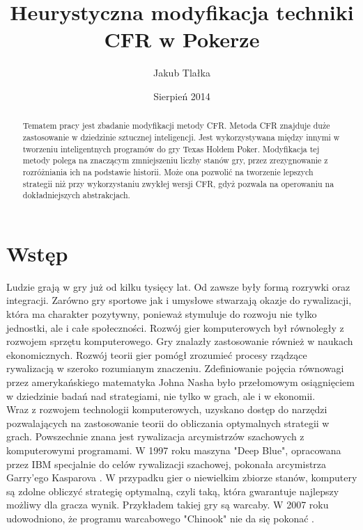 \documentclass[magisterska]{pracamgr}
\author{Jakub Tlałka}
\title{Heurystyczna modyfikacja techniki CFR w Pokerze}
\date{Sierpień 2014}
\begin{document}
\maketitle

\begin{abstract}
Tematem pracy jest zbadanie modyfikacji metody CFR. Metoda CFR znajduje
duże zastosowanie w dziedzinie sztucznej inteligencji. Jest wykorzystywana między innymi
w tworzeniu inteligentnych programów do gry Texas Holdem Poker. Modyfikacja
tej metody polega na znaczącym zmniejszeniu liczby stanów gry, przez zrezygnowanie z rozróżniania
ich na podstawie historii. Może ona pozwolić na tworzenie lepszych strategii niż przy wykorzystaniu
zwykłej wersji CFR, gdyż pozwala na operowaniu na dokładniejszych abstrakcjach.
\end{abstract}

\tableofcontents

\chapter{Wstęp}

\noindent
Ludzie grają w gry już od kilku tysięcy lat. Od zawsze były formą rozrywki oraz integracji.
Zarówno gry sportowe jak i umysłowe stwarzają okazje do rywalizacji, która ma charakter pozytywny, ponieważ
stymuluje do rozwoju nie tylko jednostki, ale i całe społeczności. Rozwój gier komputerowych był równoległy
z rozwojem sprzętu komputerowego. Gry znalazły zastosowanie również w naukach
ekonomicznych. Rozwój teorii gier pomógł zrozumieć procesy rządzące rywalizacją w szeroko rozumianym
znaczeniu. Zdefiniowanie pojęcia równowagi przez amerykańskiego matematyka Johna Nasha \cite{nash} było przełomowym
osiągnięciem w dziedzinie badań nad strategiami, nie tylko w grach, ale i w ekonomii. \\

\noindent
Wraz z rozwojem technologii komputerowych, uzyskano dostęp do narzędzi pozwalających na zastosowanie
teorii do obliczania optymalnych strategii w grach. Powszechnie znana jest rywalizacja
arcymistrzów szachowych z komputerowymi programami. W 1997 roku maszyna "Deep Blue", opracowana przez IBM
specjalnie do celów rywalizacji szachowej, pokonała arcymistrza Garry'ego Kasparova \cite{kasparov}. W przypadku gier
o niewielkim zbiorze stanów, komputery są zdolne obliczyć strategię optymalną, czyli taką, która
gwarantuje najlepszy możliwy dla gracza wynik. Przykładem takiej gry są warcaby. W 2007 roku udowodniono, że programu warcabowego
"Chinook" nie da się pokonać \cite{chinook}. \\
\end{document}
